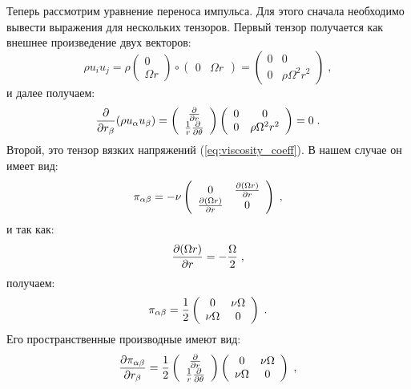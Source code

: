 Теперь рассмотрим уравнение переноса импульса. Для этого сначала необходимо вывести выражения для нескольких тензоров.
Первый тензор получается как внешнее произведение двух векторов:
\begin{equation}
\rho u_iu_j = \rho\left(\begin{array}{c} 0 \\ \Omega r\end{array}\right)\circ\left(\begin{array}{cc} 0 & \Omega r\end{array}\right)=
    \left(\begin{array}{cc}
    0 & 0 \\
    0 & \rho\Omega^2r^2
    \end{array}\right)\;,
\end{equation}
и далее получаем:
\begin{equation}
    \frac{\partial}{\partial r_{\beta}}(\rho u_{\alpha}u_{\beta})=\left(\begin{array}{c}
        \frac{\partial}{\partial r} \\ \frac{1}{r}\frac{\partial}{\partial\theta}
    \end{array}\right)
    \left(\begin{array}{cc}
        0 & 0 \\
        0 & \rho\Omega^2r^2
    \end{array}\right)=0\;.
\end{equation}
Второй, это тензор вязких напряжений (\ref{eq:viscosity_coeff}). В нашем случае он имеет вид:
\begin{equation}
    \pi_{\alpha\beta} = -\nu\left(\begin{array}{cc}
        0 & \frac{\partial(\Omega r)}{\partial r} \\
        \frac{\partial(\Omega r)}{\partial r} & 0
    \end{array}\right)\;,
\end{equation}
и так как:
\begin{equation}
    \frac{\partial(\Omega r)}{\partial r} = -\frac{\Omega}{2}\;,
\end{equation}
получаем:
\begin{equation}
    \pi_{\alpha\beta} = \frac{1}{2}\left(\begin{array}{cc}
        0 & \nu\Omega \\
        \nu\Omega & 0
    \end{array}\right)\;.
\end{equation}
Его пространственные производные имеют вид:
\begin{equation}
    \frac{\partial\pi_{\alpha\beta}}{\partial r_{\beta}}=\frac{1}{2}\left(\begin{array}{c}
        \frac{\partial}{\partial r} \\ \frac{1}{r}\frac{\partial}{\partial\theta}
    \end{array}\right)
    \left(\begin{array}{cc}
        0 & \nu\Omega \\
        \nu\Omega & 0
    \end{array}\right)\;,
\end{equation}
